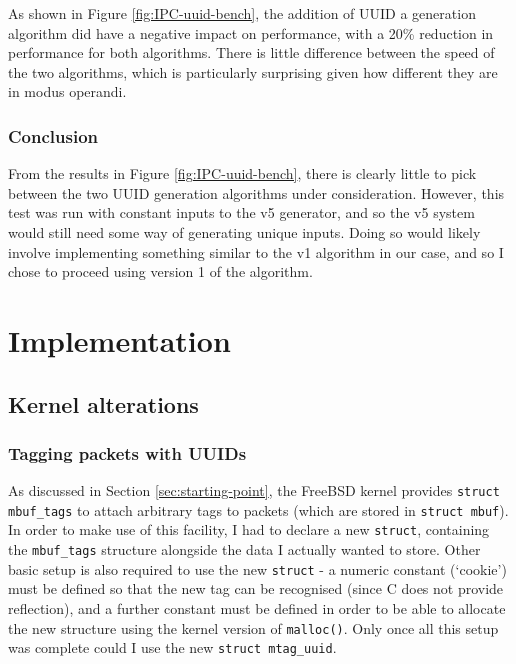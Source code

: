 \documentclass[a4paper,12pt,twoside,openright]{report}
\begin{document}
	As shown in Figure \ref{fig:IPC-uuid-bench}, the addition of UUID a generation algorithm did have a negative impact on performance, with a 20\% reduction in performance for both algorithms. There is little difference between the speed of the two algorithms, which is particularly surprising given how different they are in modus operandi.
	
	\subsection{Conclusion}
	
	From the results in Figure \ref{fig:IPC-uuid-bench}, there is clearly little to pick between the two UUID generation algorithms under consideration. However, this test was run with constant inputs to the v5 generator, and so the v5 system would still need some way of generating unique inputs. Doing so would likely involve implementing something similar to the v1 algorithm in our case, and so I chose to proceed using version 1 of the algorithm.
	
	
	\chapter{Implementation}
	
	\section{Kernel alterations}
	
	\subsection{Tagging packets with UUIDs}
	
	As discussed in Section \ref{sec:starting-point}, the FreeBSD kernel provides \verb|struct mbuf_tags| to attach arbitrary tags to packets (which are stored in \verb|struct mbuf|). In order to make use of this facility, I had to declare a new \verb|struct|, containing the \verb|mbuf_tags| structure alongside the data I actually wanted to store. Other basic setup is also required to use the new \verb|struct| - a numeric constant (`cookie') must be defined so that the new tag can be recognised (since C does not provide reflection), and a further constant must be defined in order to be able to allocate the new structure using the kernel version of \verb|malloc()|. Only once all this setup was complete could I use the new \verb|struct mtag_uuid|.
	
\end{document}
